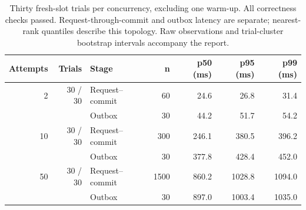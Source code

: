 \begin{table}[!htbp]
\caption{Thirty fresh-slot trials per concurrency, excluding one warm-up. All correctness checks passed. Request-through-commit and outbox latency are separate; nearest-rank quantiles describe this topology. Raw observations and trial-cluster bootstrap intervals accompany the report.}
\label{tab:booking-results}
\centering\small\setlength{\tabcolsep}{3pt}
\begin{tabular}{@{}rrlrrrr@{}}
\toprule
Attempts & Trials & Stage & n & p50 (ms) & p95 (ms) & p99 (ms) \\
\midrule
2 & 30 / 30 & Request--commit & 60 & 24.6 & 26.8 & 31.4 \\
\midrule
 & & Outbox & 30 & 44.2 & 51.7 & 54.2 \\
\midrule
10 & 30 / 30 & Request--commit & 300 & 246.1 & 380.5 & 396.2 \\
\midrule
 & & Outbox & 30 & 377.8 & 428.4 & 452.0 \\
\midrule
50 & 30 / 30 & Request--commit & 1500 & 860.2 & 1028.8 & 1094.0 \\
\midrule
 & & Outbox & 30 & 897.0 & 1003.4 & 1035.0 \\
\bottomrule
\end{tabular}

\end{table}
